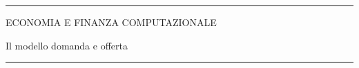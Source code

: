 \documentclass[12pt,aspectratio=169]{beamer}
\begin{document}
\begin{frame}
\begin{center}
\rule{\textwidth}{2pt}

\vskip3mm
ECONOMIA E FINANZA COMPUTAZIONALE

Il modello domanda e offerta

\rule{\textwidth}{2pt}
\end{center}

\end{frame}


\end{document}
